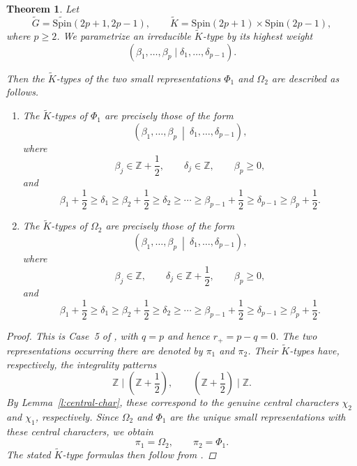 \documentclass{amsart}
\newcommand{\bbZ}{{\mathbb Z}}
\newcommand{\Spin}{{\mathrm{Spin}}}
\newtheorem{thm}{Theorem}[section]
\theoremstyle{definition}
\newcommand{\tu}{\widetilde}
\begin{document}
\begin{thm}\label{thm:K-types-2p1}
Let
\[
\tu G=\tu{\Spin}(2p+1,2p-1),
\qquad
\tu K=\Spin(2p+1)\times\Spin(2p-1),
\]
where \(p\geq2\). We parametrize an irreducible \(\tu K\)-type by its
highest weight
\[
(\beta_1,\ldots,\beta_p
 \mid
 \delta_1,\ldots,\delta_{p-1}).
\]

Then the \(\tu K\)-types of the two small representations
\(\Phi_1\) and \(\Omega_2\) are described as follows.

\begin{enumerate}

\item
The \(\tu K\)-types of \(\Phi_1\) are precisely those of the form
\begin{equation}\label{e:2p1-2p1-chi1}
\left(
\beta_1,\ldots,\beta_p
\ \middle|\
\delta_1,\ldots,\delta_{p-1}
\right),
\end{equation}
where
\[
\beta_j\in\bbZ+\frac12,
\qquad
\delta_j\in\bbZ,
\qquad
\beta_p\geq0,
\]
and
\[
\beta_1+\frac12
\geq\delta_1
\geq\beta_2+\frac12
\geq\delta_2
\geq\cdots
\geq\beta_{p-1}+\frac12
\geq\delta_{p-1}
\geq\beta_p+\frac12.
\]

\item
The \(\tu K\)-types of \(\Omega_2\) are precisely those of the form
\begin{equation}\label{e:2p1-2p1-chi2}
\left(
\beta_1,\ldots,\beta_p
\ \middle|\
\delta_1,\ldots,\delta_{p-1}
\right),
\end{equation}
where
\[
\beta_j\in\bbZ,
\qquad
\delta_j\in\bbZ+\frac12,
\qquad
\beta_p\geq0,
\]
and
\[
\beta_1+\frac12
\geq\delta_1
\geq\beta_2+\frac12
\geq\delta_2
\geq\cdots
\geq\beta_{p-1}+\frac12
\geq\delta_{p-1}
\geq\beta_p+\frac12.
\]

\end{enumerate}
\begin{proof}

This is Case~5 of \cite[Theorem~4.1]{BTs18}, with $q=p$ and hence
$r_+=p-q=0$.  The two representations occurring there are denoted
by $\pi_1$ and $\pi_2$.  Their $\tu K$-types have, respectively, the
integrality patterns
\[
\bbZ\mid\left(\bbZ+\frac12\right),
\qquad
\left(\bbZ+\frac12\right)\mid\bbZ.
\]
By Lemma~\ref{l:central-char}, these correspond to the genuine central
characters $\chi_2$ and $\chi_1$, respectively.  Since
$\Omega_2$ and $\Phi_1$ are the unique small representations with
these central characters, we obtain
\[
\pi_1=\Omega_2,\qquad \pi_2=\Phi_1.
\]
The stated $\tu K$-type formulas then follow from
\cite[Theorem~4.1, Case~5]{BTs18}.
\end{proof}




\end{thm}
\end{document}

